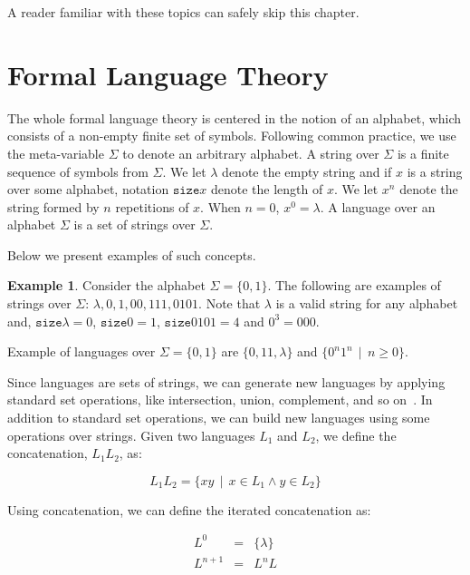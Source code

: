 \documentclass[oneside,12pt]{scrbook}
\renewcommand{\geq}{\geqslant}
\theoremstyle{definition}
\newtheorem{Example}{Example}
\newcommand{\size}{\ensuremath{\texttt{size}}}
\theoremstyle{plain}
\theoremstyle{definition}
\begin{document}
A reader familiar with these topics can safely skip this chapter.

\section{Formal Language Theory}\label{section:formallanguage}

The whole formal language theory is centered in the notion of an alphabet, which consists of a
non-empty finite set of symbols. Following common practice, we use the meta-variable $\Sigma$ to
denote an arbitrary alphabet. A string over $\Sigma$ is a finite sequence of symbols from $\Sigma$.
We let $\lambda$ denote the empty string and if $x$ is a string over some alphabet, notation $\size{x}$
denote the length of $x$. We let $x^n$ denote the string formed by $n$ repetitions of $x$.
When $n = 0$, $x^0 = \lambda$. A language over an alphabet $\Sigma$ is a set of strings over $\Sigma$.

Below we present examples of such concepts.

\begin{Example}
  Consider the alphabet $\Sigma = \{0,1\}$. The following are examples of strings over $\Sigma$:
  $\lambda, 0, 1, 00, 111, 0101$. Note that $\lambda$ is a valid string for any
  alphabet and,
  $\size{\lambda} = 0$, $\size{0} = 1$, $\size{0101} = 4$ and $0^3 = 000$.

  Example of languages over $\Sigma = \{0,1\}$ are $\{0,11,\lambda\}$ and $\{0^n1^n\,\mid\,n \geq 0\}$.
\end{Example}

Since languages are sets of strings, we can generate new languages by applying standard set operations,
like intersection, union, complement, and so on~\cite{Hopcroft2000}. In addition to standard set operations,
we can build new languages using some operations over strings. Given two languages $L_1$ and $L_2$, we define the
concatenation, $L_1L_2$, as:

\begin{equation*}
L_1L_2 =\{xy\,\mid\,x \in L_1 \land y \in L_2\}
\end{equation*}

Using concatenation, we can define the iterated concatenation as:

\begin{equation*}
\begin{array}{lcl}
  L^0       & = & \{\lambda\}\\
  L^{n + 1} & = & L^n L
\end{array}
\end{equation*}
\end{document}
